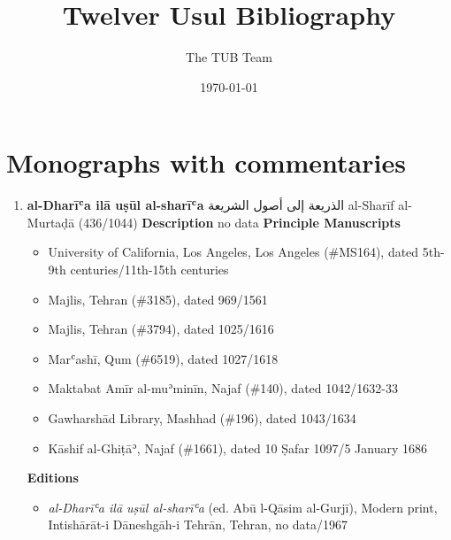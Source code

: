 \documentclass{article}
\title{Twelver Usul Bibliography}
\author{The TUB Team}
\date{\today}
\begin{document}
    \maketitle
    \tableofcontents
    \pagebreak
    \section{Monographs with commentaries}
\begin{enumerate}
      \item \textbf{al-Dharīʿa ilā uṣūl al-sharīʿa} \label{al-Dharīʿa ilā uṣūl al-sharīʿa}
        \newline
        \textarabic{الذريعة إلى أصول الشريعة}
        \newline
        al-Sharīf al-Murtaḍā
        \newline
        (436/1044)
        \newline
        \newline
        \textbf{Description}
        \newline	 
        no data
        \newline
        \newline
    \textbf{Principle Manuscripts}
\begin{itemize}
    \item University of California, Los Angeles, Los Angeles (\#MS164), dated 5th-9th centuries/11th-15th centuries
    
    \item Majlis, Tehran (\#3185), dated 969/1561
    
    \item Majlis, Tehran (\#3794), dated 1025/1616
    
    \item Marʿashī, Qum (\#6519), dated 1027/1618
    
    \item Maktabat Amīr al-muʾminīn, Najaf (\#140), dated 1042/1632-33
    
    \item Gawharshād Library, Mashhad (\#196), dated 1043/1634
    
    \item Kāshif al-Ghiṭāʾ, Najaf (\#1661), dated 10 Ṣafar 1097/5 January 1686
    \end{itemize}
\textbf{Editions}
\begin{itemize}
        \item \emph{al-Dharīʿa ilā uṣūl al-sharīʿa} (ed. Abū l-Qāsim al-Gurjī), Modern print, Intishārāt-i Dāneshgāh-i Tehrān, Tehran, no data/1967
        

\end{itemize}
\end{enumerate}
\end{document}
